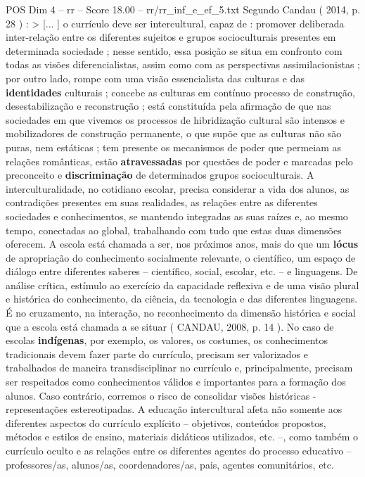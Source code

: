 \begin{textsample}{POS Dim 4 – rr – Score 18.00 – rr/rr\_inf\_e\_ef\_5.txt}
Segundo Candau ( 2014, p. 28 ) : > [... ] o currículo deve ser intercultural, capaz de : promover deliberada inter-relação entre os diferentes sujeitos e grupos socioculturais presentes em determinada sociedade ; nesse sentido, essa posição se situa em confronto com todas as visões diferencialistas, assim como com as perspectivas assimilacionistas ; por outro lado, rompe com uma visão essencialista das culturas e das \textbf{identidades} culturais ; concebe as culturas em contínuo processo de construção, desestabilização e reconstrução ; está constituída pela afirmação de que nas sociedades em que vivemos os processos de hibridização cultural são intensos e mobilizadores de construção permanente, o que supõe que as culturas não são puras, nem estáticas ; tem presente os mecanismos de poder que permeiam as relações românticas, estão \textbf{atravessadas} por questões de poder e marcadas pelo preconceito e \textbf{discriminação} de determinados grupos socioculturais.
A interculturalidade, no cotidiano escolar, precisa considerar a vida dos alunos, as contradições presentes em suas realidades, as relações entre as diferentes sociedades e conhecimentos, se mantendo integradas as suas raízes e, ao mesmo tempo, conectadas ao global, trabalhando com tudo que estas duas dimensões oferecem.
A escola está chamada a ser, nos próximos anos, mais do que um \textbf{lócus} de apropriação do conhecimento socialmente relevante, o científico, um espaço de diálogo entre diferentes saberes – científico, social, escolar, etc. – e linguagens.
De análise crítica, estímulo ao exercício da capacidade reflexiva e de uma visão plural e histórica do conhecimento, da ciência, da tecnologia e das diferentes linguagens.
É no cruzamento, na interação, no reconhecimento da dimensão histórica e social que a escola está chamada a se situar ( CANDAU, 2008, p. 14 ).
No caso de escolas \textbf{indígenas}, por exemplo, os valores, os costumes, os conhecimentos tradicionais devem fazer parte do currículo, precisam ser valorizados e trabalhados de maneira transdisciplinar no currículo e, principalmente, precisam ser respeitados como conhecimentos válidos e importantes para a formação dos alunos.
Caso contrário, corremos o risco de consolidar visões históricas - representações estereotipadas.
A educação intercultural afeta não somente aos diferentes aspectos do currículo explícito – objetivos, conteúdos propostos, métodos e estilos de ensino, materiais didáticos utilizados, etc. –, como também o currículo oculto e as relações entre os diferentes agentes do processo educativo – professores/as, alunos/as, coordenadores/as, pais, agentes comunitários, etc.

\end{textsample}
